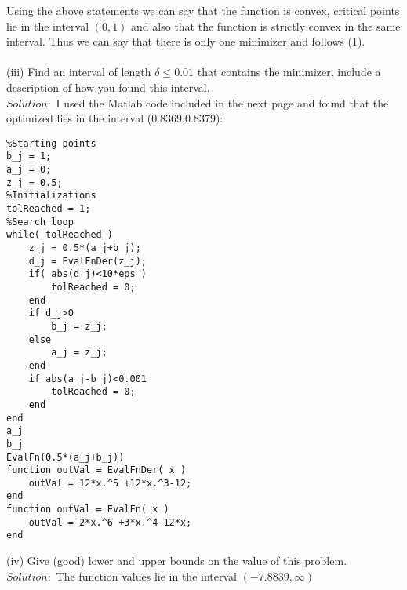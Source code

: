 \documentclass[12pt]{report}
\begin{document}
Using the above statements we can say that the function is convex, critical points lie in the interval $(0,1)$ and also that the
function is strictly convex in the same interval. Thus we can say that there is only one minimizer and follows (1).
\\
\\
(iii) Find an interval of length $\delta \leq 0.01$ that contains the minimizer, include a description of how you found this
interval.\\
$Solution:$ I used the Matlab code included in the next page and found that the optimized lies in the interval (0.8369,0.8379):
\begin{lstlisting}
%Starting points
b_j = 1;
a_j = 0;
z_j = 0.5;
%Initializations
tolReached = 1;
%Search loop
while( tolReached )
    z_j = 0.5*(a_j+b_j);
    d_j = EvalFnDer(z_j);
    if( abs(d_j)<10*eps )
        tolReached = 0;
    end
    if d_j>0
        b_j = z_j;
    else
        a_j = z_j;
    end
    if abs(a_j-b_j)<0.001
        tolReached = 0;
    end
end
a_j
b_j
EvalFn(0.5*(a_j+b_j))
function outVal = EvalFnDer( x )
    outVal = 12*x.^5 +12*x.^3-12;
end
function outVal = EvalFn( x )
    outVal = 2*x.^6 +3*x.^4-12*x;
end
\end{lstlisting}

(iv) Give (good) lower and upper bounds on the value of this problem.\\
$Solution:$ The function values lie in the interval $(-7.8839,\infty)$

\pagebreak
\end{document}
